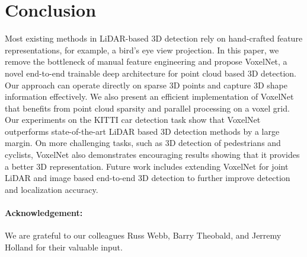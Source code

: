 \documentclass[10pt,twocolumn,letterpaper]{article}
\begin{document}
\begin{table}[!t]
\centering
{}
\caption{Performance evaluation on KITTI test set.}
\label{table:test_set_result}
\end{table}










%
 


\section{Conclusion}
Most existing methods in LiDAR-based 3D detection rely on hand-crafted feature representations, for example, a bird's eye view projection. In this paper, we remove the bottleneck of manual feature engineering and propose VoxelNet, a novel end-to-end trainable deep architecture for point cloud based 3D detection. Our approach can operate directly on sparse 3D points and capture 3D shape information effectively. We also present an efficient implementation of VoxelNet that benefits from point cloud sparsity and parallel processing on a voxel grid. Our experiments on the KITTI car detection task show that VoxelNet outperforms state-of-the-art LiDAR based 3D detection methods by a large margin. On more challenging tasks, such as 3D detection of pedestrians and cyclists, VoxelNet also demonstrates encouraging results showing that it provides a better 3D representation. Future work includes extending VoxelNet for joint LiDAR and image based end-to-end 3D detection to further improve detection and localization accuracy.





%
 

\paragraph{Acknowledgement:} 

We are grateful to our colleagues Russ Webb, Barry Theobald, and Jerremy Holland for their valuable input. 
{\small


}
\end{document}
